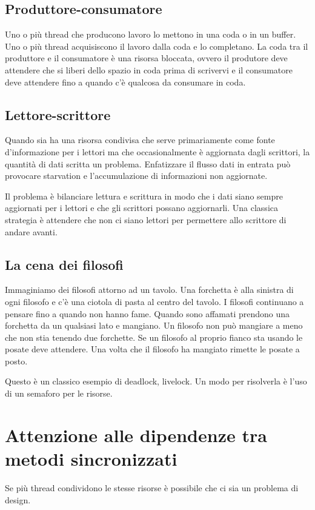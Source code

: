 \documentclass[11pt,a4paper]{book}
\begin{document}
\subsection{Produttore-consumatore}
Uno o più thread che producono lavoro lo mettono in una coda o in un buffer. Uno o più thread acquisiscono il lavoro dalla coda e lo completano. La coda tra il produttore e il consumatore è una risorsa bloccata, ovvero il produtore deve attendere che si liberi dello spazio in coda prima di scrivervi e il consumatore deve attendere fino a quando c'è qualcosa da consumare in coda.

\subsection{Lettore-scrittore}
Quando sia ha una risorsa condivisa che serve primariamente come fonte d'informazione per i lettori ma che occasionalmente è aggiornata dagli scrittori, la quantità di dati scritta  un problema. Enfatizzare il flusso dati in entrata può provocare starvation e l'accumulazione di informazioni non aggiornate.

Il problema è bilanciare lettura e scrittura in modo che i dati siano sempre aggiornati per i lettori e che gli scrittori possano aggiornarli. Una classica strategia è attendere che non ci siano lettori per permettere allo scrittore di andare avanti.

\subsection{La cena dei filosofi}
Immaginiamo dei filosofi attorno ad un tavolo. Una forchetta è alla sinistra di ogni filosofo e c'è una ciotola di pasta al centro del tavolo. I filosofi continuano a pensare fino a quando non hanno fame. Quando sono affamati prendono una forchetta da un qualsiasi lato e mangiano. Un filosofo non può mangiare a meno che non stia tenendo due forchette. Se un filosofo al proprio fianco sta usando le posate deve attendere. Una volta che il filosofo ha mangiato rimette le posate a posto.

Questo è un classico esempio di deadlock, livelock. Un modo per risolverla è l'uso di un semaforo per le risorse.

\section{Attenzione alle dipendenze tra metodi sincronizzati}
Se più thread condividono le stesse risorse è possibile che ci sia un problema di design.
\end{document}
